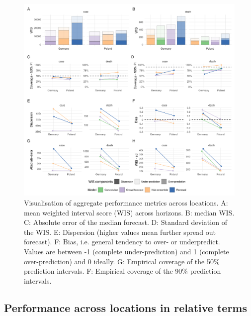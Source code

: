 \documentclass[
]{article}
\begin{document}
\begin{figure}[H]
\includegraphics[width=1\linewidth,]{../analysis/plots/aggregate-performance-2-weeks-locations-all-v4} \caption{Visualisation of aggregate performance metrics across locations. A: mean weighted interval score (WIS) across horizons. B: median WIS. C: Absolute error of the median forecast. D: Standard deviation of the WIS. E: Dispersion (higher values mean further spread out forecast). F: Bias, i.e. general tendency to over- or underpredict. Values are between -1 (complete under-prediction) and 1 (complete over-prediction) and 0 ideally. G: Empirical coverage of the 50\% prediction intervals. F: Empirical coverage of the 90\% prediction intervals.}\label{fig:performance-locations}
\end{figure}

\hypertarget{performance-across-locations-in-relative-terms}{%
\subsection{Performance across locations in relative terms}\label{performance-across-locations-in-relative-terms}}
\end{document}
